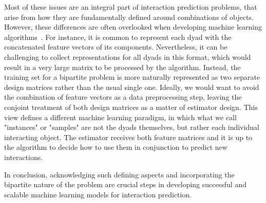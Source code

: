 Most of these issues are an integral part of interaction prediction problems,
that arise from how they are fundamentally defined around combinations of objects.
%
However, these differences are often overlooked when developing machine learning algorithms~\cite{pahikkala2015more}.
%
For instance, it is common to represent each dyad with the concatenated feature vectors of its components. Nevertheless, it can be challenging to collect representations for all dyads in this format, which would result in a very large matrix to be processed by the algorithm.
%
Instead, the training set for a bipartite problem is more naturally represented as two separate design matrices rather than the usual single one.
Ideally, we would want to avoid the combination of feature vectors as a data preprocessing step, leaving the conjoint treatment of both design matrices as a matter of estimator design. This view defines a different machine learning paradigm, in which what we call "instances" or "samples" are not the dyads themselves, but rather each individual interacting object. The estimator receives both feature matrices and it is up to the algorithm to decide how to use them in conjunction to predict new interactions.


In conclusion, acknowledging such defining aspects and incorporating the bipartite nature of the problem are crucial steps in developing successful and scalable machine learning models for interaction prediction.

